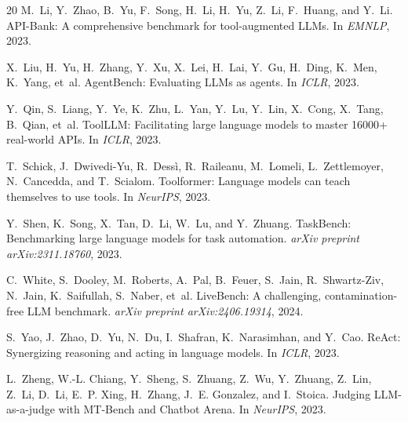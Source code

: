 \documentclass[11pt,a4paper]{article}
\begin{document}
\begin{thebibliography}{20}
M.~Li, Y.~Zhao, B.~Yu, F.~Song, H.~Li, H.~Yu, Z.~Li, F.~Huang, and Y.~Li.
\newblock API-Bank: A comprehensive benchmark for tool-augmented LLMs.
\newblock In \emph{EMNLP}, 2023.

X.~Liu, H.~Yu, H.~Zhang, Y.~Xu, X.~Lei, H.~Lai, Y.~Gu, H.~Ding, K.~Men, K.~Yang, et~al.
\newblock AgentBench: Evaluating LLMs as agents.
\newblock In \emph{ICLR}, 2023.

Y.~Qin, S.~Liang, Y.~Ye, K.~Zhu, L.~Yan, Y.~Lu, Y.~Lin, X.~Cong, X.~Tang, B.~Qian, et~al.
\newblock ToolLLM: Facilitating large language models to master 16000+ real-world APIs.
\newblock In \emph{ICLR}, 2023.

T.~Schick, J.~Dwivedi-Yu, R.~Dess{\`i}, R.~Raileanu, M.~Lomeli, L.~Zettlemoyer, N.~Cancedda, and T.~Scialom.
\newblock Toolformer: Language models can teach themselves to use tools.
\newblock In \emph{NeurIPS}, 2023.

Y.~Shen, K.~Song, X.~Tan, D.~Li, W.~Lu, and Y.~Zhuang.
\newblock TaskBench: Benchmarking large language models for task automation.
\newblock \emph{arXiv preprint arXiv:2311.18760}, 2023.

C.~White, S.~Dooley, M.~Roberts, A.~Pal, B.~Feuer, S.~Jain, R.~Shwartz-Ziv, N.~Jain, K.~Saifullah, S.~Naber, et~al.
\newblock LiveBench: A challenging, contamination-free LLM benchmark.
\newblock \emph{arXiv preprint arXiv:2406.19314}, 2024.

S.~Yao, J.~Zhao, D.~Yu, N.~Du, I.~Shafran, K.~Narasimhan, and Y.~Cao.
\newblock ReAct: Synergizing reasoning and acting in language models.
\newblock In \emph{ICLR}, 2023.

L.~Zheng, W.-L. Chiang, Y.~Sheng, S.~Zhuang, Z.~Wu, Y.~Zhuang, Z.~Lin, Z.~Li, D.~Li, E.~P. Xing, H.~Zhang, J.~E. Gonzalez, and I.~Stoica.
\newblock Judging LLM-as-a-judge with MT-Bench and Chatbot Arena.
\newblock In \emph{NeurIPS}, 2023.

\end{thebibliography}
\end{document}
